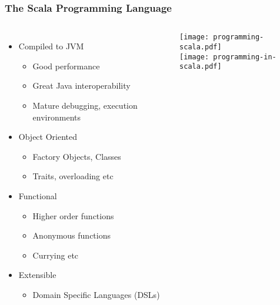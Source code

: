 \documentclass[xcolor=pdflatex,dvipsnames,table]{beamer}
\begin{document}
\begin{frame}[fragile]
\frametitle{The Scala Programming Language}

\begin{columns}[c]


\begin{itemize}
\item Compiled to JVM
\begin{itemize}
\item Good performance
\item Great Java interoperability
\item Mature debugging, execution environments
\end{itemize}
\item Object Oriented
\begin{itemize}
\item Factory Objects, Classes
\item Traits, overloading etc
\end{itemize}
\item Functional
\begin{itemize}
\item Higher order functions
\item Anonymous functions
\item Currying etc
\end{itemize}
\item Extensible
\begin{itemize}
\item Domain Specific Languages (DSLs)
\end{itemize}
\end{itemize}


\begin{center}
\texttt{[image: programming-scala.pdf]} \\
\texttt{[image: programming-in-scala.pdf]}
\end{center}

\end{columns}
\end{frame}
\end{document}
